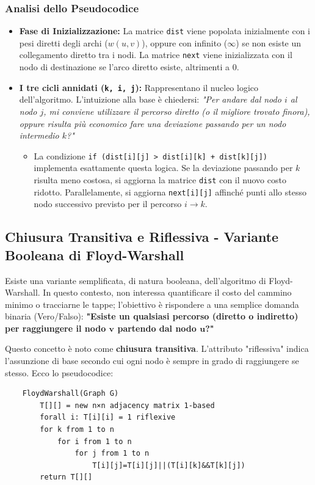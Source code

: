 \subsubsection*{Analisi dello Pseudocodice}
\begin{itemize}
    \item \textbf{Fase di Inizializzazione:} La matrice \texttt{dist} viene popolata inizialmente con i pesi diretti degli archi ($w(u,v)$), oppure con infinito ($\infty$) se non esiste un collegamento diretto tra i nodi. La matrice \texttt{next} viene inizializzata con il nodo di destinazione se l'arco diretto esiste, altrimenti a 0.
    \item \textbf{I tre cicli annidati (\texttt{k, i, j}):} Rappresentano il nucleo logico dell'algoritmo. L'intuizione alla base è chiedersi: \textit{"Per andare dal nodo $i$ al nodo $j$, mi conviene utilizzare il percorso diretto (o il migliore trovato finora), oppure risulta più economico fare una deviazione passando per un nodo intermedio $k$?"}
    \begin{itemize}
        \item La condizione \texttt{if (dist[i][j] > dist[i][k] + dist[k][j])} implementa esattamente questa logica. Se la deviazione passando per $k$ risulta meno costosa, si aggiorna la matrice \texttt{dist} con il nuovo costo ridotto. Parallelamente, si aggiorna \texttt{next[i][j]} affinché punti allo stesso nodo successivo previsto per il percorso $i \to k$.
    \end{itemize}
\end{itemize}

\subsection{Chiusura Transitiva e Riflessiva - Variante Booleana di Floyd-Warshall}

Esiste una variante semplificata, di natura booleana, dell'algoritmo di Floyd-Warshall. In questo contesto, non interessa quantificare il costo del cammino minimo o tracciarne le tappe; l'obiettivo è rispondere 
a una semplice domanda binaria (Vero/Falso): \textbf{"Esiste un qualsiasi percorso (diretto o indiretto) per raggiungere il nodo $\bm{v}$ partendo dal nodo $\bm{u}$?"}

\noindent Questo concetto è noto come \textbf{chiusura transitiva}. L'attributo "riflessiva" indica l'assunzione di base secondo cui ogni nodo è sempre in grado di raggiungere se stesso. Ecco lo pseudocodice:\smallskip\\
\begin{verbatim}
    FloydWarshall(Graph G)
        T[][] = new n×n adjacency matrix 1-based
        forall i: T[i][i] = 1 riflexive
        for k from 1 to n
            for i from 1 to n
                for j from 1 to n
                    T[i][j]=T[i][j]||(T[i][k]&&T[k][j])
        return T[][]
\end{verbatim}

